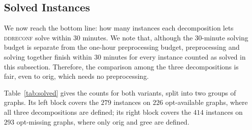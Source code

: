 \documentclass[conference]{IEEEtran}
\newcommand{\OrigDecom}{\textsf{orig}\xspace}
\newcommand{\HeurDecom}{\textsf{gree}\xspace}
\newcommand{\OptDecom}{\textsf{opt}\xspace}
\begin{document}

\subsection{Solved Instances}
\label{subsec:solved}

We now reach the bottom line: how many instances each decomposition lets
\textsc{ddreconf} solve within $30$ minutes.
We note that, although the $30$-minute solving budget is separate from the
one-hour preprocessing budget, preprocessing and solving together finish within
$30$ minutes for every instance counted as solved in this subsection. Therefore, the
comparison among the three decompositions is fair, even to \OrigDecom, which needs
no preprocessing.

Table~\ref{tab:solved} gives the counts for both variants, split into two groups of
graphs. Its left block covers the $279$ instances on $226$ \OptDecom-available graphs,
where all three decompositions are defined; its right block covers the $414$
instances on $293$ \OptDecom-missing graphs, where only \OrigDecom and \HeurDecom are
defined.
\end{document}
